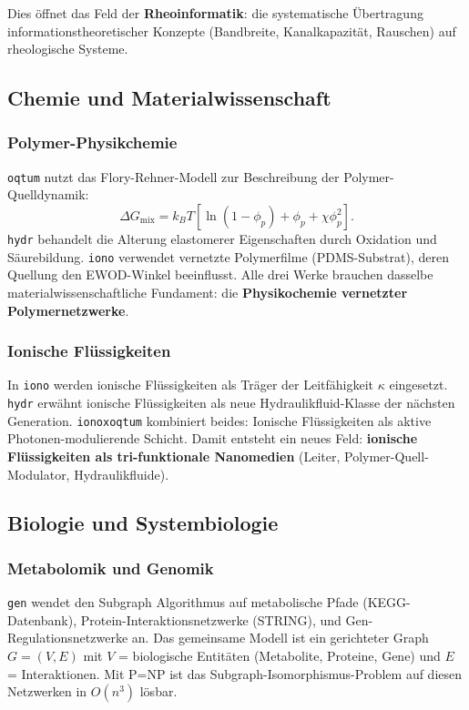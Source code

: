 ﻿\documentclass[a4paper,12pt]{scrreprt}
\theoremstyle{definition}
\begin{document}
Dies öffnet das Feld der \textbf{Rheoinformatik}: die systematische Übertragung
informationstheoretischer Konzepte (Bandbreite, Kanalkapazität, Rauschen)
auf rheologische Systeme.

\subsection{Chemie und Materialwissenschaft}

\subsubsection{Polymer-Physikchemie}

\texttt{oqtum} nutzt das Flory-Rehner-Modell zur Beschreibung der
Polymer-Quell\-dynamik:
\[
  \Delta G_{\text{mix}} = k_B T \left[
    \ln(1-\phi_p) + \phi_p + \chi \phi_p^2
  \right].
\]
\texttt{hydr} behandelt die Alterung elastomerer Eigenschaften durch Oxidation
und Säurebildung. \texttt{iono} verwendet vernetzte Polymerfilme (PDMS-Substrat),
deren Quellung den EWOD-Winkel beeinflusst. Alle drei Werke brauchen
dasselbe materialwissenschaftliche Fundament: die \textbf{Physikochemie
vernetzter Polymernetzwerke}.

\subsubsection{Ionische Flüssigkeiten}

In \texttt{iono} werden ionische Flüssigkeiten als Träger der Leitfähigkeit
$\kappa$ eingesetzt. \texttt{hydr} erwähnt ionische Flüssigkeiten als neue
Hydraulikfluid-Klasse der nächsten Generation. \texttt{ionoxoqtum}
kombiniert beides: Ionische Flüssigkeiten als aktive Photonen-modulierende
Schicht. Damit entsteht ein neues Feld: \textbf{ionische Flüssigkeiten als
tri-funktionale Nanomedien} (Leiter, Polymer-Quell-Modulator, Hydraulikfluide).

\subsection{Biologie und Systembiologie}

\subsubsection{Metabolomik und Genomik}

\texttt{gen} wendet den Subgraph Algorithmus auf metabolische Pfade
(KEGG-Datenbank), Protein-Interaktionsnetzwerke (STRING), und
Gen-Regulationsnetzwerke an. Das gemeinsame Modell ist ein gerichteter Graph
$G = (V, E)$ mit $V$ = biologische Entitäten (Metabolite, Proteine, Gene)
und $E$ = Interaktionen. Mit P=NP ist das Subgraph-Isomorphismus-Problem
auf diesen Netzwerken in $O(n^3)$ lösbar.
\end{document}

